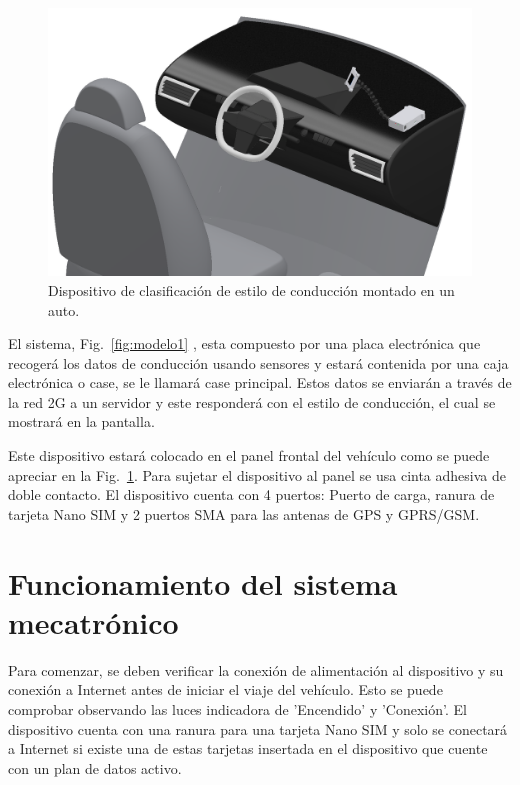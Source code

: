 \begin{figure}[htbp!]
\centering
\includegraphics[width=\textwidth]{con_auto1.png}
\caption{Dispositivo de clasificación de estilo de conducción montado en un auto.}
\label{fig:modelo2}
\end{figure}

El sistema, Fig.~\ref{fig:modelo1} , esta compuesto por una placa electrónica que recogerá los datos de conducción usando sensores y estará contenida por una caja electrónica o case, se le llamará case principal. Estos datos se enviarán a través de la red 2G a un servidor y este responderá con el estilo de conducción, el cual se mostrará en la pantalla.

Este dispositivo estará colocado en el panel frontal del vehículo como se puede apreciar en la Fig.~\ref{fig:modelo2}. Para sujetar el dispositivo al panel se usa cinta adhesiva de doble contacto. El dispositivo cuenta con 4 puertos: Puerto de carga, ranura de tarjeta Nano SIM y 2 puertos SMA para las antenas de GPS y GPRS/GSM.


\section{Funcionamiento del sistema mecatrónico}
Para comenzar, se deben verificar la conexión de alimentación al dispositivo y su conexión a Internet antes de iniciar el viaje del vehículo. Esto se puede comprobar observando las luces indicadora de 'Encendido' y 'Conexión'. El dispositivo cuenta con una ranura para una tarjeta Nano SIM y solo se conectará a Internet si existe una de estas tarjetas insertada en el dispositivo que cuente con un plan de datos activo.


